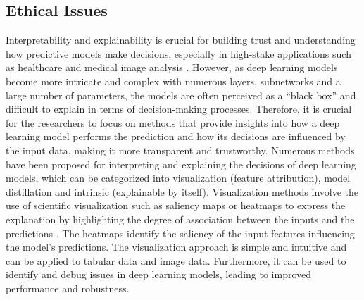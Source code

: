 \documentclass[preprint,12pt]{elsarticle}
\begin{document}
\subsection{Ethical Issues}
Interpretability and explainability is crucial for building trust and understanding how predictive models make decisions, especially in high-stake applications such as healthcare and medical image analysis \citep{tonekaboni_what_2019}. However, as deep learning models become more intricate and complex with numerous layers, subnetworks and a large number of parameters, the models are often perceived as a “black box” and difficult to explain in terms of decision-making processes. Therefore, it is crucial for the researchers to focus on methods that provide insights into how a deep learning model performs the prediction and how its decisions are influenced by the input data, making it more transparent and trustworthy. Numerous methods have been proposed for interpreting and explaining the decisions of deep learning models, which can be categorized into visualization (feature attribution), model distillation and intrinsic (explainable by itself). Visualization methods involve the use of scientific visualization such as saliency maps or heatmaps to express the explanation by highlighting the degree of association between the inputs and the predictions \citep{tjoa_enhancing_2023}. The heatmaps identify the saliency of the input features influencing the model’s predictions. The visualization approach is simple and intuitive and can be applied to tabular data and image data. Furthermore, it can be used to identify and debug issues in deep learning models, leading to improved performance and robustness.
\end{document}
